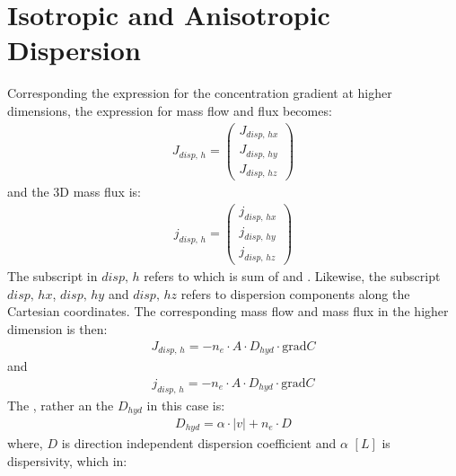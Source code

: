 \documentclass[letterpaper,10pt,english]{jupyterBook}
\begin{document}
\section{Isotropic and Anisotropic  Dispersion}
\label{\detokenize{content/transport/L10/22_reactive_transport:id1}}
\sphinxAtStartPar
Corresponding the expression for the concentration gradient at higher dimensions, the expression for mass flow and flux becomes:
\begin{equation*}
\begin{split}
J_{disp,\, h} = \begin{pmatrix}
J_{disp,\, hx}\\
J_{disp,\, hy}\\
J_{disp,\, hz}
\end{pmatrix}
\end{split}
\end{equation*}
\sphinxAtStartPar
and the 3\sphinxhyphen{}D mass flux is:
\begin{equation*}
\begin{split}
j_{disp,\, h} = \begin{pmatrix}
j_{disp,\, hx}\\
j_{disp,\, hy}\\
j_{disp,\, hz}
\end{pmatrix}
\end{split}
\end{equation*}
\sphinxAtStartPar
The subscript in \({{disp,\, h}}\) refers to  which is sum of  and . Likewise, the subscript \({{disp,\, hx}}\), \({{disp,\, hy}}\) and \({{disp,\, hz}}\) refers to dispersion components along the Cartesian coordinates. The corresponding mass flow and mass flux in the higher dimension is then:
\begin{equation*}
\begin{split}
J_{disp,\, h} = - n_e \cdot A \cdot D_{hyd} \cdot \text{grad}C
\end{split}
\end{equation*}
\sphinxAtStartPar
and
\begin{equation*}
\begin{split}
j_{disp,\, h} = - n_e \cdot A \cdot D_{hyd} \cdot \text{grad}C
\end{split}
\end{equation*}
\sphinxAtStartPar
The , rather an  the \(D_{hyd}\) in this case is:
\begin{equation*}
\begin{split}
D_{hyd} = \alpha \cdot |v| + n_e \cdot D 
\end{split}
\end{equation*}
\sphinxAtStartPar
where, \(D\) is direction independent dispersion coefficient and \(\alpha\) \([L]\) is dispersivity, which in:
\end{document}
